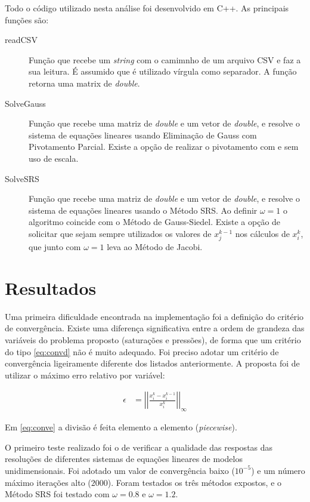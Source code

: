 \documentclass[final,5p]{elsarticle}
\numberwithin{equation}{section}
\begin{document}
        Todo o código utilizado nesta análise foi desenvolvido em C++. As principais funções são:

        \begin{description}
            \item[readCSV] Função que recebe um \emph{string} com o camimnho de um arquivo CSV e faz a sua leitura. É assumido que é utilizado vírgula como separador. A função retorna uma matrix de \emph{double}.
            \item[SolveGauss] Função que recebe uma matriz de \emph{double} e um vetor de \emph{double}, e resolve o sistema de equações lineares usando Eliminação de Gauss com Pivotamento Parcial. Existe a opção de realizar o pivotamento com e sem uso de escala.
            \item[SolveSRS] Função que recebe uma matriz de \emph{double} e um vetor de \emph{double}, e resolve o sistema de equações lineares usando o Método SRS. Ao definir $\omega = 1$ o algoritmo coincide com o Método de Gauss-Siedel. Existe a opção de solicitar que sejam sempre utilizados os valores de $x_j^{k-1}$ nos cálculos de $x_i^{k}$, que junto com $\omega = 1$ leva ao Método de Jacobi.
        \end{description}

\section{Resultados}

        Uma primeira dificuldade encontrada na implementação foi a definição do critério de convergência. Existe uma diferença significativa entre a ordem de grandeza das variáveis do problema proposto (saturações e pressões), de forma que um critério do tipo \ref{eq:convd} não é muito adequado. Foi preciso adotar um critério de convergência ligeiramente diferente dos listados anteriormente. A proposta foi de utilizar o máximo erro relativo por variável:

        \begin{align}
            \epsilon &= \left|\left|\frac{x_i^k - x_i^{k-1}}{x_i^k}\right|\right|_\infty \label{eq:conve}
        \end{align}

        Em \ref{eq:conve} a divisão é feita elemento a elemento (\emph{piecewise}).

        O primeiro teste realizado foi o de verificar a qualidade das respostas das resoluções de diferentes sistemas de equações lineares de modelos unidimensionais. Foi adotado um valor de convergência baixo ($10^{-5}$) e um número máximo iterações alto ($2000$). Foram testados os três métodos expostos, e o Método SRS foi testado com $\omega = 0.8$ e $\omega = 1.2$.
\end{document}
